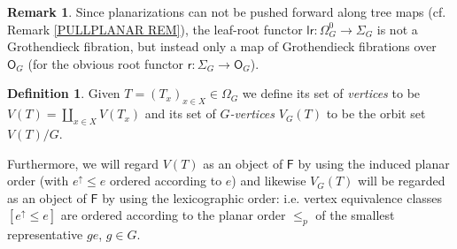 \documentclass[a4paper,10pt
,draft
]{article}%
\numberwithin{equation}{section}
\numberwithin{figure}{section}
\theoremstyle{definition} %
\newtheorem{definition}[equation]{Definition}%
\newtheorem{remark}[equation]{Remark}%
\newcommand{\Fin}{\mathsf{F}}%
\newcommand{\1}{\ensuremath{\mathbbm 1}}%
\begin{document}
\begin{remark}\label{LRROOTMAP REM}
	Since planarizations can not be pushed forward along tree maps (cf. Remark \ref{PULLPLANAR REM}),
	the leaf-root functor $\mathsf{lr} \colon \Omega_{G}^0 \to \Sigma_G$ is not a Grothendieck fibration,
	but instead only a map of Grothendieck fibrations over $\mathsf{O}_G$ 
	(for the obvious root functor $\mathsf{r} \colon \Sigma_G \to \mathsf{O}_G$).
\end{remark}


\begin{definition}\label{VG DEF}
Given $T = (T_x)_{x \in X} \in \Omega_G$ we define its set of \textit{vertices} to be $V(T) = \coprod_{x \in X} V(T_x)$
and its set of
\textit{$G$-vertices} $V_G(T)$ to be the orbit set $V(T)/G$.

Furthermore, we will regard 
$V(T)$ as an object of $\Fin$ by using the induced planar order
(with $e^{\uparrow}\leq e$ ordered according to $e$)
and likewise $V_G(T)$ will be regarded as an object of $\Fin$ by using the lexicographic order: i.e. vertex equivalence classes 
$[e^{\uparrow} \leq e]$ are ordered according to the planar order $\leq_p$ of the smallest representative $ge$, $g \in G$.
\end{definition}
\end{document}
